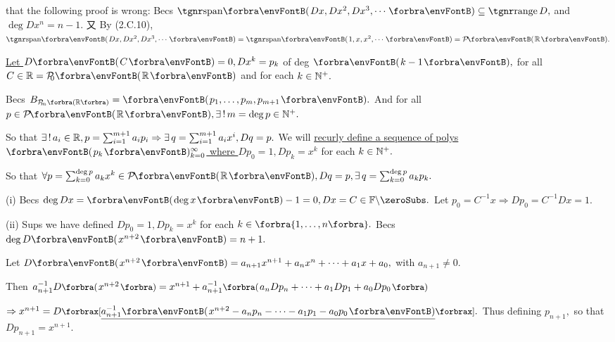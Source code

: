 \! \;\NOTICE that the following proof is wrong:\parSol{}
Becs $\Span{Dx,Dx^2,Dx^3,\cdots}\subseteq\range D,$ and $\deg Dx^n=n-1.$\parSol{}
又 By (2.C.10), $\Span{Dx,Dx^2,Dx^3,\cdots}=\Span{1,x,x^2,\cdots}=\PoRi.$\par\vspace{4pt}\quad
\uline{Let $D\Par{C}=0,Dx^k=p_k$} of deg $\Par{k-1},$ for all $C\in\Rbb=\PoR{0}$ and for each $k\in{\mathbb{N}^+}.$\par\quad
Becs $B_{\PoR[\SmallPar]{m}}=\Par{p_1,\dots,p_m,p_{m+1}}.$ And for all $p\in\PoRi,\exists\,!\,m=\deg p\in\Nbp.$\par\quad
So that $\exists\,!\,a_i\in{\mathbb{R}},p=\sum_{i=1}^{m+1}a_ip_i\Rightarrow\exists\,q=\sum_{i=1}^{m+1}a_{i}x^{i},Dq=p.$\PfEnd\vspace{6pt}\quad
{\Or We will \uline{recurly define a sequence of polys $\Par{p_k}{_{k=0}^\infty}$ where $Dp_0=1,Dp_k=x^k$} for each $k\in{\mathbb{N}^+}.$}\par\vspace{2pt}\quad
{\FontSmall So that $\forall p=\sum_{k=0}^{\deg p}a_k x^k\in\PoRi,Dq=p,\exists\,q={\sum_{k=0}^{\deg p}a_k p_k}.$}\par\vspace{4pt}\quad
(i) {Becs $\deg Dx=\Par{\!\deg x}-1=0,Dx=C\in\nonzeroFbb.$ Let $p_0=C^{-1}x\Rightarrow Dp_0=C^{-1}Dx=1.$}\vspace{2pt}\par\quad\Endi
(ii) {Sups we have defined $Dp_0=1,Dp_k=x^k$ for each $k\in\Bra{1,\dots,n}.$ Becs $\deg D\Par{x^{n+2}}=n+1.$}\vspace{2pt}\par\quad\Hii
{Let {\;$D\Par{x^{n+2}}=a_{n+1}x^{n+1}+a_n x^n+\dots+a_1 x+a_0,$} with $a_{n+1}\neq 0.$}\vspace{2pt}\par\quad\Hii
{Then {\;$a_{n+1}^{-1}D\BigPar{x^{n+2}}=x^{n+1}+a_{n+1}^{-1}\BigPar{a_n Dp_n+\dots+a_1 Dp_1 +a_0 Dp_0}$}}\vspace{2pt}\par\quad\Hii
{$\Rightarrow x^{n+1}=D\XSbra{\uline{a_{n+1}^{-1}\Par{x^{n+2}-a_n p_n-\dots-a_1 p_1-a_0 p_0}}}.$ Thus defining $p_{n+1},$ so that $Dp_{n+1}=x^{n+1}.$}\PfEnd
\SepLine

